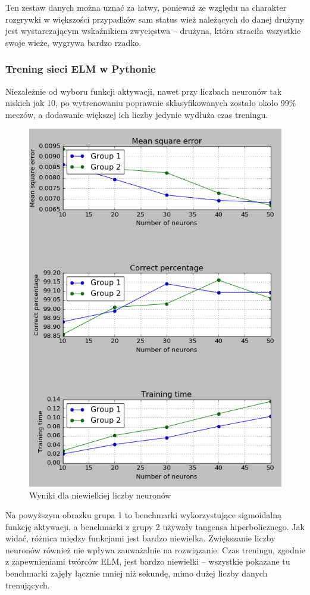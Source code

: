 \documentclass{article}
\begin{document}
Ten zestaw danych można uznać za łatwy, ponieważ ze względu na charakter rozgrywki w większości przypadków sam status wież należących do danej drużyny jest wystarczającym wskaźnikiem zwycięstwa -- drużyna, która straciła wszystkie swoje wieże, wygrywa bardzo rzadko.
\subsubsection{Trening sieci ELM w Pythonie}
Niezależnie od wyboru funkcji aktywacji, nawet przy liczbach neuronów tak niskich jak 10, po wytrenowaniu poprawnie sklasyfikowanych zostało około 99\% meczów, a dodawanie większej ich liczby jedynie wydłuża czas treningu. 

\begin{figure}[H]
\centering
\includegraphics[width=\textwidth]{wyniki_dota2_python.png}
\caption{Wyniki dla niewielkiej liczby neuronów}
\end{figure}
Na powyższym obrazku grupa 1 to benchmarki wykorzystujące sigmoidalną funkcję aktywacji, a benchmarki z grupy 2 używały tangensa hiperbolicznego. Jak widać, różnica między funkcjami jest bardzo niewielka. Zwiększanie liczby neuronów również nie wpływa zauważalnie na rozwiązanie. Czas treningu, zgodnie z zapewnieniami twórców ELM, jest bardzo niewielki -- wszystkie pokazane tu benchmarki zajęły łącznie mniej niż sekundę, mimo dużej liczby danych trenujących. 
\end{document}
